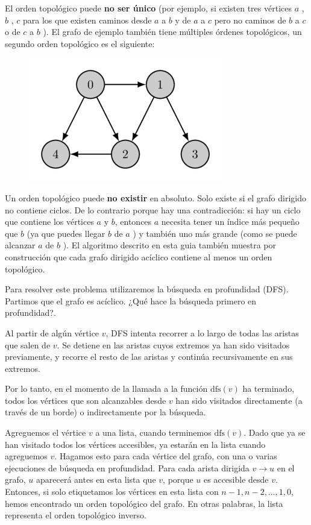 El orden topológico puede \textbf{no ser único} (por ejemplo, si existen tres vértices $a$ , $b$ , $c$ para los que existen caminos desde $a$ a $b$ y de $a$ a $c$ pero no caminos de $b$ a $c$ o de $c$ a $b$ ). El grafo de ejemplo también tiene múltiples órdenes topológicos, un segundo orden topológico es el siguiente:

\begin{figure}[h!]
	\centering
	\includegraphics[width=0.35\linewidth]{img/topological_3}
	\label{fig:topological2}
\end{figure}

Un orden topológico puede \textbf{no existir} en absoluto. Solo existe si el grafo dirigido no contiene ciclos. De lo contrario porque hay una contradicción: si hay un ciclo que contiene los vértices $a$ y $b$, entonces $a$ necesita tener un índice más pequeño que $b$ (ya que puedes llegar $b$ de $a$ ) y también uno más grande (como se puede alcanzar $a$ de $b$ ). El algoritmo descrito en esta guia también muestra por construcción que cada grafo dirigido acíclico contiene al menos un orden topológico.

Para resolver este problema utilizaremos la búsqueda en profundidad (DFS). Partimos que el grafo es acíclico. ¿Qué hace la búsqueda primero en profundidad?. 

Al partir de algún vértice $v$, DFS intenta recorrer a lo largo de todas las aristas que salen de $v$. Se detiene en las aristas cuyos extremos ya han sido visitados previamente, y recorre el resto de las aristas y continúa recursivamente en sus extremos.

Por lo tanto, en el momento de la llamada a la función $\text{dfs}(v)$ ha terminado, todos los vértices que son alcanzables desde $v$ han sido visitados directamente (a través de un borde) o indirectamente por la búsqueda.

Agreguemos el vértice $v$ a una lista, cuando terminemos $\text{dfs}(v)$. Dado que ya se han visitado 
todos los vértices accesibles, ya estarán en la lista cuando agreguemos $v$. Hagamos esto para cada 
vértice del grafo, con una o varias ejecuciones de búsqueda en profundidad. Para cada arista dirigida 
$v \rightarrow u$ en el grafo, $u$ aparecerá antes en esta lista que $v$, porque $u$ es accesible desde 
$v$. Entonces, si solo etiquetamos los vértices en esta lista con $n-1, n-2, \dots, 1, 0$, hemos 
encontrado un orden topológico del grafo. En otras palabras, la lista representa el orden topológico 
inverso.

